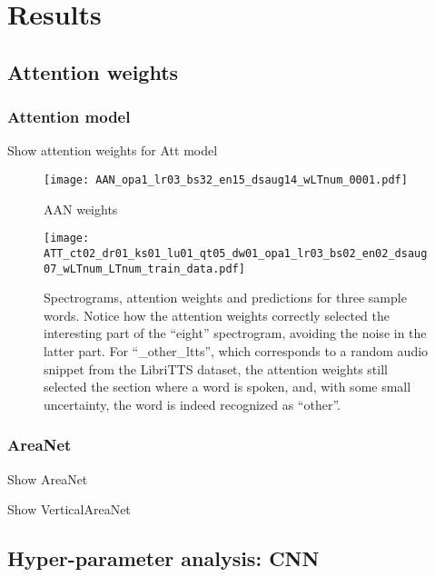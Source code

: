 
\section{Results}
\label{sec:results}

\subsection{Attention weights}

\subsubsection{Attention model}

Show attention weights for Att model

\begin{figure}[t!]
    \centering
    \texttt{[image: AAN\_opa1\_lr03\_bs32\_en15\_dsaug14\_wLTnum\_0001.pdf]}
    \caption{AAN weights}%
    \label{fig:attention_weights_area}
\end{figure}

\begin{figure*}[t!]
    \centering
    \texttt{[image: ATT\_ct02\_dr01\_ks01\_lu01\_qt05\_dw01\_opa1\_lr03\_bs02\_en02\_dsaug07\_wLTnum\_LTnum\_train\_data.pdf]}
    \caption{Spectrograms, attention weights and predictions for three sample words.
    Notice how the attention weights correctly selected the interesting part of
    the ``eight'' spectrogram, avoiding the noise in the latter part.
    For ``\_other\_ltts'', which corresponds to a random audio snippet from the LibriTTS
    dataset, the attention weights still selected the section where a word is spoken,
    and, with some small uncertainty, the word is indeed recognized as ``other''.}%
    \label{fig:attention_weights_standard}
\end{figure*}

\subsubsection{AreaNet}

Show AreaNet

Show VerticalAreaNet

\subsection{Hyper-parameter analysis: CNN}

